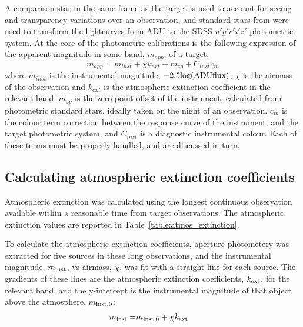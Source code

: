 A comparison star in the same frame as the target is used to account for seeing and transparency variations over an observation, and standard stars from \citet{smith2002} were used to transform the lightcurves from ADU to the SDSS $u'g'r'i'z'$ photometric system. At the core of the photometric calibrations is the following expression of the apparent magnitude in some band, $m_{app}$, of a target,
\begin{equation}
    \label{eqn:observations:instrumental magnitude from scratch}
    m_{app} = m_{inst} + \chi k_{ext} + m_{zp} + C_{inst}c_{m}
\end{equation}
where $m_{inst}$ is the instrumental magnitude, $-2.5 \rm log(ADU flux)$, $\chi$ is the airmass of the observation and $k_{ext}$ is the atmospheric extinction coefficient in the relevant band. $m_{zp}$ is the zero point offset of the instrument, calculated from photometric standard stars, ideally taken on the night of an observation. $c_{m}$ is the colour term correction between the response curve of the instrument, and the target photometric system, and $C_{inst}$ is a diagnostic instrumental colour. Each of these terms must be properly handled, and are discussed in turn.


\subsection{Calculating atmospheric extinction coefficients}
\label{sect:calcualting atmospheric extinction}

Atmospheric extinction was calculated using the longest continuous observation available within a reasonable time from target observations.
The atmospheric extinction values are reported in Table~\ref{table:atmos_extinction}.

To calculate the atmospheric extinction coefficients, aperture photometery was extracted for five sources in these long observations, and the instrumental magnitude, $m_{\rm inst}$, vs airmass, $\chi$, was fit with a straight line for each source.
The gradients of these lines are the atmospheric extinction coefficients, $k_{\rm ext}$, for the relevant band, and the y-intercept is the instrumental magnitude of that object above the atmosphere, $m_{\rm inst,0}$:
\begin{align*}
    m_{\rm inst} =& m_{\rm inst,0} + \chi k_{\rm ext}
\end{align*}

